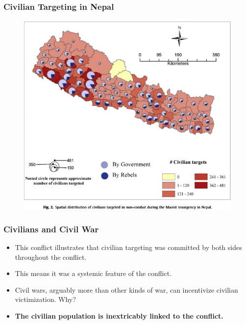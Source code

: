 \documentclass[handout]{beamer}
\begin{document}
\begin{frame} 
	\frametitle{\LARGE{Civilian Targeting in Nepal}}
	\begin{figure}[ht!]
		\centering
		\includegraphics[width=\textwidth,height=\textheight,keepaspectratio]{Nepalkillings.png}
	\end{figure}
\end{frame}

\begin{frame} 
	\frametitle{\LARGE{Civilians and Civil War}}
	\begin{itemize}
		\item This conflict illustrates that civilian targeting was committed by both sides throughout the conflict. \pause
		\item This means it was a systemic feature of the conflict. \pause
		\item Civil wars, arguably more than other kinds of war, can incentivize civilian victimization. Why? \pause
		\item \textbf{The civilian population is inextricably linked to the conflict.}
	\end{itemize}
\end{frame}
\end{document}
